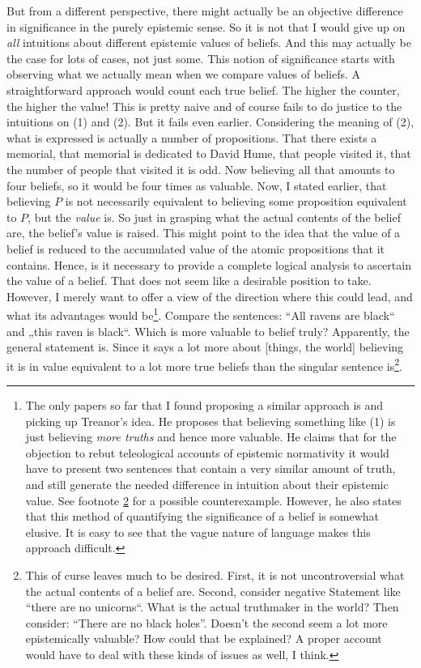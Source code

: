 \documentclass[12pt,numbers=noenddot]{scrartcl}
\begin{document}
But from a different perspective, there might actually be an objective difference in significance in the purely epistemic sense. So it is not that I would give up on \emph{all} intuitions about different epistemic values of beliefs. And this may actually be the case for lots of cases, not just some. This notion of significance starts with observing what we actually mean when we compare values of beliefs. A straightforward approach would count each true belief. The higher the counter, the higher the value! This is pretty naive and of course fails to do justice to the intuitions on (1) and (2). But it fails even earlier. Considering the meaning of (2), what is expressed is actually a number of propositions. That there exists a memorial, that memorial is dedicated to David Hume, that people visited it, that the number of people that visited it is odd. Now believing all that amounts to four beliefs, so it would be four times as valuable. Now, I stated earlier, that believing $P$ is not necessarily equivalent to believing some proposition equivalent to $P$, but the \emph{value} is. So just in grasping what the actual contents of the belief are, the belief's value is raised. This might point to the idea that the value of a belief is reduced to the accumulated value of the atomic propositions that it contains. Hence, is it necessary to provide a complete logical analysis to ascertain the value of a belief. That does not seem like a desirable position to take. However, I merely want to offer a view of the direction where this could lead, and what its advantages would be\footnote{The only papers so far that I found proposing a similar approach is \textcite{Treanor2014-TRETTA} and \textcite{Pritchard2014} picking up Treanor's idea. He proposes that believing something like (1) is just believing \emph{more truths} and hence more valuable. He claims that for the objection to rebut teleological accounts of epistemic normativity it would have to present two sentences that contain a very similar amount of truth, and still generate the needed difference in intuition about their epistemic value. See footnote \ref{foot:noblackholes} for a possible counterexample. However, he also states that this method of quantifying the significance of a belief is somewhat elusive. It is easy to see that the vague nature of language makes this approach difficult.}.
Compare the sentences: “All ravens are black“ and „this raven is black“. Which is more valuable to belief truly? Apparently, the general statement is. Since it says a lot more about [things, the world] believing it  is in value equivalent to a lot more true beliefs than the singular sentence is\footnote{\label{foot:noblackholes}This of curse leaves much to be desired. First, it is not uncontroversial what the actual contents of a belief are. Second, consider negative Statement like “there are no unicorns“. What is the actual truthmaker in the world? Then consider: “There are no black holes”. Doesn't the second seem a lot more epistemically valuable? How could that be explained? A proper account would have to deal with these kinds of issues as well, I think.}.
\end{document}
